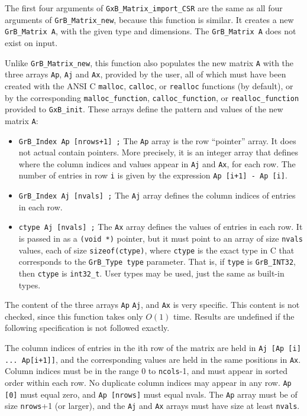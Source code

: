\documentclass[12pt]{article}
\begin{document}
The first four arguments of \verb'GxB_Matrix_import_CSR' are the same as
all four arguments of \verb'GrB_Matrix_new', because this function is similar.
It creates a new \verb'GrB_Matrix A', with the given type and dimensions.
The \verb'GrB_Matrix A' does not exist on input.

Unlike \verb'GrB_Matrix_new', this function also populates the new matrix
\verb'A' with the three arrays \verb'Ap', \verb'Aj' and \verb'Ax', provided by
the user, all of which must have been created with the ANSI C \verb'malloc',
\verb'calloc', or \verb'realloc' functions (by default), or by the
corresponding \verb'malloc_function', \verb'calloc_function', or
\verb'realloc_function' provided to \verb'GxB_init'.  These arrays define the
pattern and values of the new matrix \verb'A':

\begin{itemize}
\item \verb'GrB_Index Ap [nrows+1] ;'  The \verb'Ap' array is the row
``pointer'' array.  It does not actual contain pointers.  More precisely, it is
an integer array that defines where the column indices and values appear in
\verb'Aj' and \verb'Ax', for each row.  The number of entries in row \verb'i'
is given by the expression \verb'Ap [i+1] - Ap [i]'.

\item \verb'GrB_Index Aj [nvals] ;'  The \verb'Aj' array defines the
column indices of entries in each row.

\item \verb'ctype Aj [nvals] ;'  The \verb'Ax' array defines the values of
entries in each row.  It is passed in as a \verb'(void *)' pointer, but it must
point to an array of size \verb'nvals' values, each of size
\verb'sizeof(ctype)', where \verb'ctype' is the exact type in C that corresponds
to the \verb'GrB_Type type' parameter.  That is, if \verb'type' is
\verb'GrB_INT32', then \verb'ctype' is \verb'int32_t'.  User types
may be used, just the same as built-in types.
\end{itemize}

The content of the three arrays \verb'Ap' \verb'Aj', and \verb'Ax' is very
specific.  This content is not checked, since this function takes only
$O(1)$ time.  Results are undefined if the following specification is not
followed exactly.

The column indices of entries in the ith row of the matrix are held in
\verb'Aj [Ap [i] ... Ap[i+1]]', and the corresponding values are held in the
same positions in \verb'Ax'.  Column indices must be in the range 0 to
\verb'ncols'-1, and must appear in sorted order within each row.  No duplicate
column indices may appear in any row.  \verb'Ap [0]' must equal zero, and
\verb'Ap [nrows]' must equal nvals.  The \verb'Ap' array must be of size
\verb'nrows'+1 (or larger), and the \verb'Aj' and \verb'Ax' arrays must have
size at least \verb'nvals'.
\end{document}
